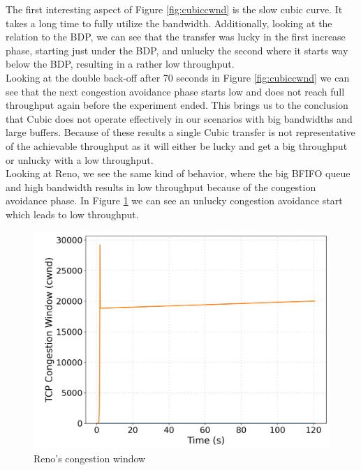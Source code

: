\documentclass[a4paper,english, 12pt]{report}
\begin{document}
The first interesting aspect of Figure \ref{fig:cubiccwnd} is the slow cubic curve. It takes a long time to fully utilize the bandwidth. Additionally, looking at the relation to the BDP, we can see that the transfer was lucky in the first increase phase, starting just under the BDP, and unlucky the second where it starts way below the BDP, resulting in a rather low throughput.\\

Looking at the double back-off after 70 seconds in Figure \ref{fig:cubiccwnd} we can see that the next congestion avoidance phase starts low and does not reach full throughput again before the experiment ended. This brings us to the conclusion that Cubic does not operate effectively in our scenarios with big bandwidths and large buffers. Because of these results a single Cubic transfer is not representative of the achievable throughput as it will either be lucky and get a big throughput or unlucky with a low throughput.\\

Looking at Reno, we see the same kind of behavior, where the big BFIFO queue and high bandwidth results in low throughput because of the congestion avoidance phase. In Figure \ref{fig:renocwnd} we can see an unlucky congestion avoidance start which leads to low throughput.
 
\begin{figure}[!h!] %
	\centering
	\includegraphics[scale=0.25]{../diagrams/witestlab/renocwnd.png}
  	\caption{Reno's congestion window}
  	\label{fig:renocwnd}
\end{figure}
\end{document}

